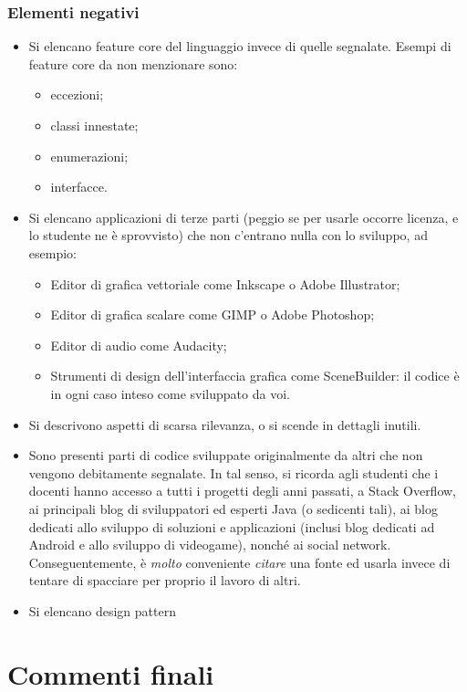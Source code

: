 \documentclass[a4paper,12pt]{report}
\begin{document}
\subsection*{Elementi negativi}
\begin{itemize}
	\item Si elencano feature core del linguaggio invece di quelle segnalate. Esempi di feature
core da non menzionare sono:
    \begin{itemize}
        \item eccezioni;
        \item classi innestate;
        \item enumerazioni;
        \item interfacce.
    \end{itemize}
	\item Si elencano applicazioni di terze parti (peggio se per usarle occorre licenza, e lo
studente ne è sprovvisto) che non c'entrano nulla con lo sviluppo, ad esempio:
    \begin{itemize}
        \item Editor di grafica vettoriale come Inkscape o Adobe Illustrator;
        \item Editor di grafica scalare come GIMP o Adobe Photoshop;
        \item Editor di audio come Audacity;
        \item Strumenti di design dell'interfaccia grafica come SceneBuilder: il codice è in ogni caso inteso come sviluppato da voi.
    \end{itemize}
	\item Si descrivono aspetti di scarsa rilevanza, o si scende in dettagli inutili.
	\item Sono presenti parti di codice sviluppate originalmente da altri che non vengono
debitamente segnalate. In tal senso, si ricorda agli studenti che i docenti hanno accesso a tutti i
progetti degli anni passati, a Stack Overflow, ai principali blog di sviluppatori ed esperti Java (o sedicenti tali), ai blog dedicati allo sviluppo di soluzioni e applicazioni (inclusi blog dedicati ad Android e allo sviluppo di videogame), nonché ai social network. Conseguentemente, è \emph{molto} conveniente \emph{citare} una fonte ed usarla invece di tentare di spacciare per proprio il lavoro di altri.
	\item Si elencano design pattern
\end{itemize}

\chapter{Commenti finali}
\end{document}
